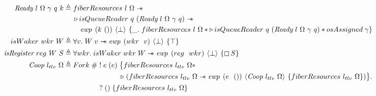 \begin{figure}[ht]
    \begin{align*}
        \gsReadyF{}~l~\Omega~\gamma~q~k & \triangleq \begin{aligned}[t]
                                                         & \gsFiberResources{l}{\Omega} \wand                                                                                                           \\
                                                         & \later isQueueReader~q~(\gsReadyF{}~l~\Omega~\gamma~q) \wand                                                                                  \\
                                                         & \quad \ewp{k~()}{\bot}{\_.\; \gsFiberResources{l}{\Omega} \ast \later isQueueReader~q~(\gsReadyF{}~l~\Omega~\gamma~q) \ast \gspdone{\gamma} }
                                                    \end{aligned} \\
        \gsIsWaker{}~wkr~W             & \triangleq \forall v.   \;  W\; v \wand{} \ewp{wkr\ \ v}{\bot}{\top}                                                                                                \\
        \gsIsRegF{}~reg~W~S             & \triangleq \forall wkr. \; \gsIsWaker{}\; wkr\; W \wand{} \ewp{reg\ \ wkr}{\bot}{\always S}                                                                         \\
        \protoF{}~l_{tlv}~\Omega              & \triangleq \begin{aligned}[t]
                                                        Fork\;       & \#\; \begin{aligned}[t]
                                     & !\; e\; (e)\; \begin{aligned}[t]
                                           & \big\{ \gsFiberResources{l_{tlv}}{\Omega} \ast                                                                              \\
                                           & \later\; (\gsFiberResources{l_{tlv}}{\Omega} \wand{} \ewp{e\ \ ()}{\protoF{}~l_{tlv}~\Omega}{\gsFiberResources{l_{tlv}}{\Omega}}) \big\} .
                                      \end{aligned} \\
                                     & ?\; ()\; \{ \gsFiberResources{l_{tlv}}{\Omega} \}
                                \end{aligned}                                             \\

\end{aligned}
\end{align*}
\end{figure}
